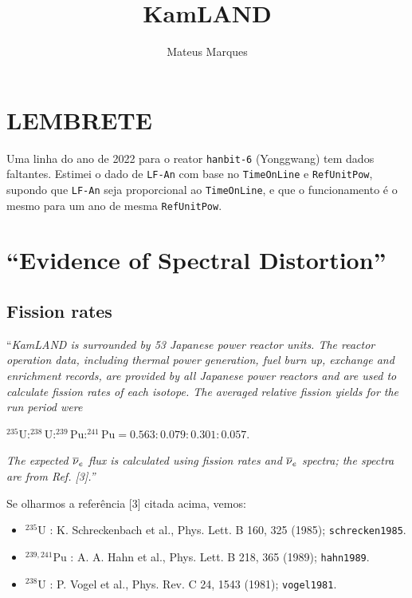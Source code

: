 \documentclass[a4paper,fleqn,12pt]{article}
\title{\Huge{\textbf{KamLAND}}}
\author{Mateus Marques}
\begin{document}
\maketitle

\section{LEMBRETE}

Uma linha do ano de 2022 para o reator \texttt{hanbit-6} (Yonggwang) tem dados faltantes. Estimei o dado de \texttt{LF-An} com base no \texttt{TimeOnLine} e \texttt{RefUnitPow}, supondo que \texttt{LF-An} seja proporcional ao \texttt{TimeOnLine}, e que o funcionamento é o mesmo para um ano de mesma \texttt{RefUnitPow}.

\section{``Evidence of Spectral Distortion''}

\subsection{Fission rates}

``\textit{KamLAND is surrounded by 53 Japanese power reactor units.
The reactor operation data, including thermal
power generation, fuel burn up, exchange and enrichment
records, are provided by all Japanese power reactors and
are used to calculate fission rates of each isotope.
The averaged relative fission yields for the run period were}

$^{235}\text{U} : ^{238}\text{U} : ^{239}\text{Pu} : ^{241}\text{Pu} = 0.563: 0.079 : 0.301: 0.057$.

\textit{The expected $\overline{\nu}_e$ flux is calculated using fission rates and $\overline{\nu}_e$ spectra; the spectra are from Ref. [3].''}

\n\n

Se olharmos a referência [3] citada acima, vemos:

\begin{itemize}
\item $^{235}\text{U}$ : K. Schreckenbach et al., Phys. Lett. B 160, 325 (1985); \texttt{schrecken1985}.

\item $^{239,241}\text{Pu}$ : A. A. Hahn et al., Phys. Lett. B 218, 365 (1989); \texttt{hahn1989}.

\item $^{238}\text{U}$ : P. Vogel et al., Phys. Rev. C 24, 1543 (1981); \texttt{vogel1981}.
\end{itemize}
\end{document}
